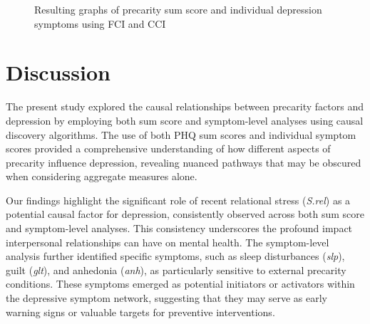 \documentclass[
]{article}
\begin{document}
\begin{figure}


\caption{\label{fig-presum}Resulting graphs of precarity sum score and
individual depression symptoms using FCI and CCI}

\end{figure}%

\section{Discussion}\label{discussion}

The present study explored the causal relationships between precarity
factors and depression by employing both sum score and symptom-level
analyses using causal discovery algorithms. The use of both PHQ sum
scores and individual symptom scores provided a comprehensive
understanding of how different aspects of precarity influence
depression, revealing nuanced pathways that may be obscured when
considering aggregate measures alone.

Our findings highlight the significant role of recent relational stress
(\emph{S.rel}) as a potential causal factor for depression, consistently
observed across both sum score and symptom-level analyses. This
consistency underscores the profound impact interpersonal relationships
can have on mental health. The symptom-level analysis further identified
specific symptoms, such as sleep disturbances (\emph{slp}), guilt
(\emph{glt}), and anhedonia (\emph{anh}), as particularly sensitive to
external precarity conditions. These symptoms emerged as potential
initiators or activators within the depressive symptom network,
suggesting that they may serve as early warning signs or valuable
targets for preventive interventions.
\end{document}
